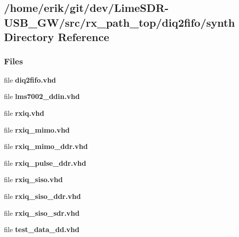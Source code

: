 \subsection{/home/erik/git/dev/\+Lime\+S\+D\+R-\/\+U\+S\+B\+\_\+\+G\+W/src/rx\+\_\+path\+\_\+top/diq2fifo/synth Directory Reference}
\label{dir_ef45acb1129d5c73d0325ebfd04d1670}
\subsubsection*{Files}
\begin{DoxyCompactItemize}
\item 
file {\bf diq2fifo.\+vhd}
\item 
file {\bf lms7002\+\_\+ddin.\+vhd}
\item 
file {\bf rxiq.\+vhd}
\item 
file {\bf rxiq\+\_\+mimo.\+vhd}
\item 
file {\bf rxiq\+\_\+mimo\+\_\+ddr.\+vhd}
\item 
file {\bf rxiq\+\_\+pulse\+\_\+ddr.\+vhd}
\item 
file {\bf rxiq\+\_\+siso.\+vhd}
\item 
file {\bf rxiq\+\_\+siso\+\_\+ddr.\+vhd}
\item 
file {\bf rxiq\+\_\+siso\+\_\+sdr.\+vhd}
\item 
file {\bf test\+\_\+data\+\_\+dd.\+vhd}
\end{DoxyCompactItemize}
